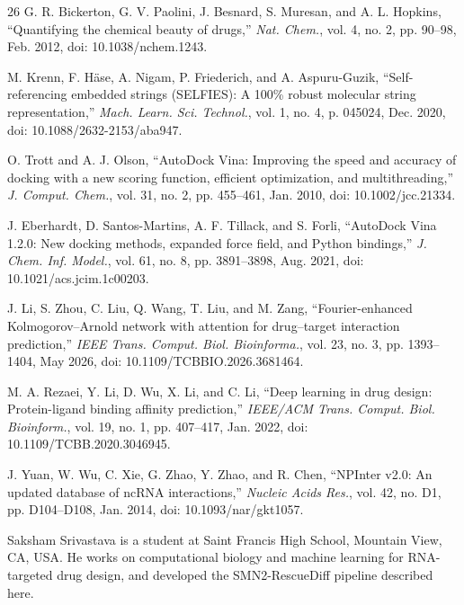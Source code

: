 \documentclass[journal]{IEEEtran}
\begin{document}
\begin{thebibliography}{26}
G. R. Bickerton, G. V. Paolini, J. Besnard, S. Muresan, and A. L.
Hopkins, ``Quantifying the chemical beauty of drugs,'' \emph{Nat.
Chem.}, vol. 4, no. 2, pp. 90--98, Feb. 2012, doi: 10.1038/nchem.1243.

M. Krenn, F. H\"ase, A. Nigam, P. Friederich, and A. Aspuru-Guzik,
``Self-referencing embedded strings (SELFIES): A 100\% robust molecular
string representation,'' \emph{Mach. Learn. Sci. Technol.}, vol. 1,
no. 4, p. 045024, Dec. 2020, doi: 10.1088/2632-2153/aba947.

O. Trott and A. J. Olson, ``AutoDock Vina: Improving the speed and
accuracy of docking with a new scoring function, efficient optimization,
and multithreading,'' \emph{J. Comput. Chem.}, vol. 31, no. 2,
pp. 455--461, Jan. 2010, doi: 10.1002/jcc.21334.

J. Eberhardt, D. Santos-Martins, A. F. Tillack, and S. Forli, ``AutoDock
Vina 1.2.0: New docking methods, expanded force field, and Python
bindings,'' \emph{J. Chem. Inf. Model.}, vol. 61, no. 8,
pp. 3891--3898, Aug. 2021, doi: 10.1021/acs.jcim.1c00203.

J. Li, S. Zhou, C. Liu, Q. Wang, T. Liu, and M. Zang,
``Fourier-enhanced Kolmogorov--Arnold network with attention for
drug--target interaction prediction,'' \emph{IEEE Trans. Comput. Biol.
Bioinforma.}, vol. 23, no. 3, pp. 1393--1404, May 2026, doi:
10.1109/TCBBIO.2026.3681464.

M. A. Rezaei, Y. Li, D. Wu, X. Li, and C. Li, ``Deep learning in drug
design: Protein-ligand binding affinity prediction,'' \emph{IEEE/ACM
Trans. Comput. Biol. Bioinform.}, vol. 19, no. 1, pp. 407--417,
Jan. 2022, doi: 10.1109/TCBB.2020.3046945.

J. Yuan, W. Wu, C. Xie, G. Zhao, Y. Zhao, and R. Chen, ``NPInter v2.0:
An updated database of ncRNA interactions,'' \emph{Nucleic Acids Res.},
vol. 42, no. D1, pp. D104--D108, Jan. 2014, doi: 10.1093/nar/gkt1057.
\end{thebibliography}

\begin{IEEEbiographynophoto}{Saksham Srivastava}
is a student at Saint Francis High School, Mountain View, CA, USA. He
works on computational biology and machine learning for RNA-targeted
drug design, and developed the SMN2-RescueDiff pipeline described here.
\end{IEEEbiographynophoto}
\end{document}
